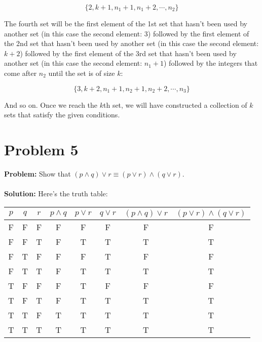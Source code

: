 \documentclass{article}
\begin{document}
$$\{2,k+1,n_1+1,n_1+2,\cdots,n_2\}$$

The fourth set will be the first element of the 1st set that hasn't been used by another set (in this case the second element: 3) followed by the first element of the 2nd set that hasn't been used by another set (in this case the second element: $k+2$) followed by the first element of the 3rd set that hasn't been used by another set (in this case the second element: $n_1+1$) followed by the integers that come after $n_2$ until the set is of size $k$:

$$\{3,k+2,n_1+1,n_2+1,n_2+2,\cdots,n_3\}$$

And so on. Once we reach the $k$th set, we will have constructed a collection of $k$ sets that satisfy the given conditions.

\section{Problem 5}
\textbf{Problem:} Show that $(p\wedge q)\vee r\equiv (p\vee r)\wedge(q\vee r)$.
\\\\
\textbf{Solution:} Here's the truth table:

\begin{center}
\begin{tabular}{cccccccc}
$p$ & $q$ & $r$ & $p\wedge q$ & $p\vee r$ & $q\vee r$ & $(p\wedge q)\vee r$ & $(p\vee r)\wedge(q\vee r)$\\
\midrule
\hline
F&F&F&F&F&F&F&F\\
F&F&T&F&T&T&T&T\\
F&T&F&F&F&T&F&F\\
F&T&T&F&T&T&T&T\\
T&F&F&F&T&F&F&F\\
T&F&T&F&T&T&T&T\\
T&T&F&T&T&T&T&T\\
T&T&T&T&T&T&T&T\\
\end{tabular}
\end{center}
\end{document}

